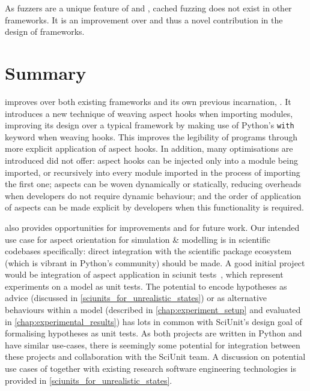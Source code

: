 As fuzzers are a unique feature of \pydysofu and \pdsfthree{}, cached fuzzing
does not exist in other \aop frameworks. It is an improvement over \pydysofu and
thus a novel contribution in the design of \aop frameworks.


\section{Summary}
\label{pdsf3_discussion}

\pdsfthree{} improves over both existing \aop{} frameworks and its own previous
incarnation, \pydysofu{}. It introduces a new technique of weaving aspect hooks
when importing modules, improving its design over a typical \aspectorientation{}
framework by making use of Python's \lstinline{with} keyword when weaving hooks.
This improves the legibility of \aspectoriented{} programs through more explicit
application of aspect hooks. In addition, many optimisations are introduced
\pydysofu did not offer: aspect hooks can be injected only into a module being
imported, or recursively into every module imported in the process of importing
the first one; aspects can be woven dynamically or statically, reducing
overheads when developers do not require dynamic behaviour; and the order of
application of aspects can be made explicit by developers when this
functionality is required.

\pdsfthree{} also provides opportunities for improvements and
for future work. Our intended use case for aspect orientation for simulation \&
modelling is in scientific codebases specifically: direct integration with the
scientific package ecosystem (which is vibrant in Python's community) should be
made. A good initial project would be integration of aspect application in
sciunit tests~\cite{sciunit_primer}, which represent experiments on a model as
unit tests. The potential to encode hypotheses as advice (discussed in
\cref{sciunits_for_unrealistic_states}) or as alternative behaviours within a
model (described in \cref{chap:experiment_setup} and evaluated in
\cref{chap:experimental_results}) has lots in common with SciUnit's design goal
of formalising hypotheses as unit tests. As both projects are written in Python
and have similar use-cases, there is seemingly some potential for integration
between these projects and collaboration with the SciUnit team. A discussion on
potential use cases of \pdsfthree together with existing research software
engineering technologies is provided in \cref{sciunits_for_unrealistic_states}.

